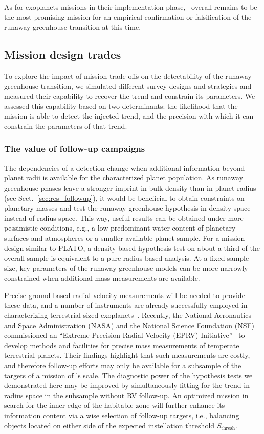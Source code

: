 \documentclass[twocolumn,twocolappendix]{aastex631}
\begin{document}
As for exoplanets missions in their implementation phase, \plato\ overall remains to be the most promising mission for an empirical confirmation or falsification of the runaway greenhouse transition at this time.


\subsection{Mission design trades}\label{sec:mission-design-trades}
To explore the impact of mission trade-offs on the detectability of the runaway greenhouse transition, we simulated different survey designs and strategies and measured their capability to recover the trend and constrain its parameters.
We assessed this capability based on two determinants: the likelihood that the mission is able to detect the injected trend, and the precision with which it can constrain the parameters of that trend.

\subsubsection{The value of follow-up campaigns}
The dependencies of a detection change when additional information beyond planet radii is available for the characterized planet population.
As runaway greenhouse phases leave a stronger imprint in bulk density than in planet radius (see Sect.~\ref{sec:res_followup}), it would be beneficial to obtain constraints on planetary masses and test the runaway greenhouse hypothesis in density space instead of radius space.
This way, useful results can be obtained under more pessimistic conditions, e.g., a low predominant water content of planetary surfaces and atmospheres or a smaller available planet sample.
For a mission design similar to PLATO, a density-based hypothesis test on about a third of the overall sample is equivalent to a pure radius-based analysis.
At a fixed sample size, key parameters of the runaway greenhouse models can be more narrowly constrained when additional mass measurements are available.

Precise ground-based radial velocity measurements will be needed to provide these data, and a number of instruments are already successfully employed in characterizing terrestrial-sized exoplanets~\citep[e.g.,][]{Queloz2001a,Pepe2010,Johnson2010b,Ribas2023}.
Recently, the National Aeronautics and Space Administration (NASA) and the National Science Foundation (NSF) commissioned an ``Extreme Precision Radial Velocity (EPRV) Initiative''~\citep{Crass2021} to develop methods and facilities for precise mass measurements of temperate terrestrial planets.
Their findings highlight that such measurements are costly, and therefore follow-up efforts may only be available for a subsample of the targets of a mission of \plato's scale.
The diagnostic power of the hypothesis tests we demonstrated here may be improved by simultaneously fitting for the trend in radius space in the subsample without RV follow-up.
An optimized mission in search for the inner edge of the habitable zone will further enhance its information content via a wise selection of follow-up targets, i.e., balancing objects located on either side of the expected instellation threshold $S_\mathrm{thresh}$.
\end{document}
